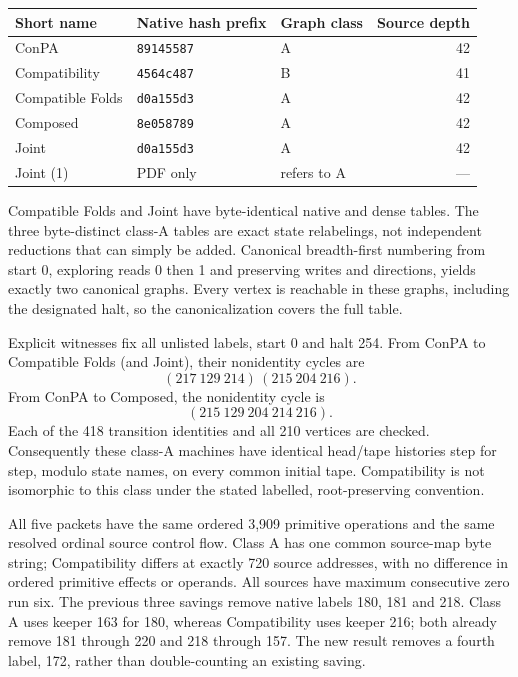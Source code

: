\documentclass[11pt,letterpaper]{article}
\begin{document}
\begin{center}\small
\begin{tabular}{lllr}\toprule
Short name & Native hash prefix & Graph class & Source depth\\\midrule
ConPA & \texttt{89145587} & A & 42\\
Compatibility & \texttt{4564c487} & B & 41\\
Compatible Folds & \texttt{d0a155d3} & A & 42\\
Composed & \texttt{8e058789} & A & 42\\
Joint & \texttt{d0a155d3} & A & 42\\
Joint (1) & PDF only & refers to A & ---\\\bottomrule
\end{tabular}
\end{center}

Compatible Folds and Joint have byte-identical native and dense tables.
The three byte-distinct class-A tables are exact state relabelings,
not independent reductions that can simply be added. Canonical
breadth-first numbering from start 0, exploring reads 0 then 1 and
preserving writes and directions, yields exactly two canonical graphs.
Every vertex is reachable in these graphs, including the designated
halt, so the canonicalization covers the full table.

Explicit witnesses fix all unlisted labels, start 0 and halt 254.
From ConPA to Compatible Folds (and Joint), their nonidentity cycles are
\[
 (217\ 129\ 214)\,(215\ 204\ 216).
\]
From ConPA to Composed, the nonidentity cycle is
\[
 (215\ 129\ 204\ 214\ 216).
\]
Each of the 418 transition identities and all 210 vertices are checked.
Consequently these class-A machines have identical head/tape histories
step for step, modulo state names, on every common initial tape.
Compatibility is not isomorphic to this class under the stated labelled,
root-preserving convention.

All five packets have the same ordered 3,909 primitive operations and
the same resolved ordinal source control flow. Class A has one common
source-map byte string; Compatibility differs at exactly 720 source
addresses, with no difference in ordered primitive effects or operands.
All sources have maximum consecutive zero run six. The previous three
savings remove native labels 180, 181 and 218. Class A uses keeper 163
for 180, whereas Compatibility uses keeper 216; both already remove
181 through 220 and 218 through 157. The new result removes a fourth
label, 172, rather than double-counting an existing saving.
\end{document}
